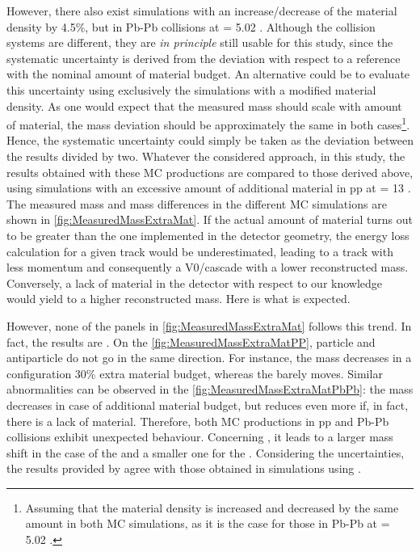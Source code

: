 However, there also exist simulations with an increase/decrease of the material density by 4.5\%, but in Pb-Pb collisions at \sqrtSnn = 5.02 \tev. Although the collision systems are different, they are \textit{in principle} still usable for this study, since the systematic uncertainty is derived from the deviation with respect to a reference with the nominal amount of material budget. An alternative could be to evaluate this uncertainty using exclusively the simulations with a modified material density. As one would expect that the measured mass should scale with amount of material, the mass deviation should be approximately the same in both cases\footnote{Assuming that the material density is increased and decreased by the same amount in both MC simulations, as it is the case for those in Pb-Pb at \sqrtSnn = 5.02 \tev.}. Hence, the systematic uncertainty could simply be taken as the deviation between the results divided by two. Whatever the considered approach, in this study, the results obtained with these MC productions are compared to those derived above, \ie using simulations with an excessive amount of additional material in pp at \sqrtS = 13 \tev.\\

The measured mass and mass differences in the different MC simulations are shown in \fig\ref{fig:MeasuredMassExtraMat}. If the actual amount of material turns out to be greater than the one implemented in the detector geometry, the energy loss calculation for a given track would be underestimated, leading to a track with less momentum and consequently a V0/cascade with a lower reconstructed mass. Conversely, a lack of material in the detector with respect to our knowledge would yield to a higher reconstructed mass. Here is what is expected.

However, none of the panels in \fig\ref{fig:MeasuredMassExtraMat} follows this trend. In fact, the results are . On the \fig\ref{fig:MeasuredMassExtraMatPP}, particle and antiparticle do not go in the same direction. For instance, the \rmAomegaP mass decreases in a configuration 30\% extra material budget, whereas the \rmOmegaM barely moves. Similar abnormalities can be observed in the \fig\ref{fig:MeasuredMassExtraMatPbPb}: the \rmKzeroS mass decreases in case of additional material budget, but reduces even more if, in fact, there is a lack of material. Therefore, both MC productions in pp and Pb-Pb collisions exhibit unexpected behaviour. Concerning \GeantThree, it leads to a larger mass shift in the case of the \rmLambda and a smaller one for the \rmKzeroS. Considering the uncertainties, the results provided by \GeantThree agree with those obtained in simulations using \GeantFour.


